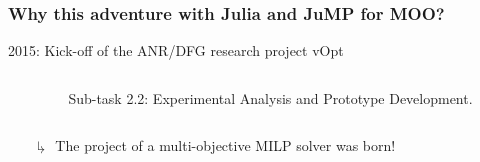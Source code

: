 \documentclass[]{beamer}
\newcommand*{\blue}[1]{\textcolor{nblue}{#1}}
\begin{document}
\begin{frame}
  \frametitle{Why this adventure with Julia and JuMP for MOO?}
\vspace{3mm}


    2015: Kick-off of  the ANR/DFG research project  \blue{vOpt}  \vspace{1.25mm}\\
    \begin{columns}
      \begin{column}{0.05\textwidth}
      \end{column}
      \begin{column}{0.85\textwidth}
              {\tiny
Sub-task 2.2: Experimental Analysis and Prototype Development.\vspace{10mm}\\}
      
      \end{column}
      \end{columns}

\begin{itemize}
\item[$\drsh$] The project of a \blue{multi-objective MILP solver} was born!
\end{itemize}            
      \bigskip
      

    

    
      
\end{frame}
\end{document}
